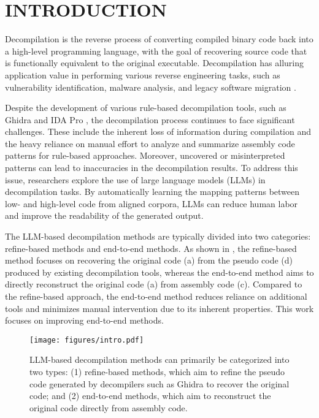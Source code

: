 \section{INTRODUCTION}

Decompilation \citep{ghidra,idapro,llm4decompile,refine_decompile,feng2024self} is the reverse process of converting compiled binary code back into a high-level programming language, with the goal of recovering source code that is functionally equivalent to the original executable.
Decompilation has alluring application value in performing various reverse engineering tasks, such as vulnerability identification, malware analysis, and legacy software migration \citep{decompilation1,decompilation2_rnn,llm4decompile,feng2024self,nova}.

Despite the development of various rule-based decompilation tools, such as Ghidra \citep{ghidra} and IDA Pro \citep{idapro}, the decompilation process continues to face significant challenges. These include the inherent loss of information during compilation \citep{variable_name,for_loop} and the heavy reliance on manual effort to analyze and summarize assembly code patterns for rule-based approaches\citep{ghidra,idapro}. 
Moreover, uncovered or misinterpreted patterns can lead to inaccuracies in the decompilation results\citep{decompilation1,decompile_ir1,variable_name,for_loop,llm4decompile}.
To address this issue, researchers explore the use of large language models (LLMs) in decompilation tasks\citep{slade,btc,llm4decompile,nova,feng2024self,refine_decompile}.
By automatically learning the mapping patterns between low- and high-level code from aligned corpora, LLMs can reduce human labor and improve the readability of the generated output.


The LLM-based decompilation methods are typically divided into two categories: refine-based methods\citep{llm4decompile,refine_decompile,hu2024degpt} and end-to-end methods\citep{feng2024self,slade,btc,nova}.
As shown in , the refine-based method focuses on recovering the original code (a) from the pseudo code (d) produced by existing decompilation tools, whereas the end-to-end method aims to directly reconstruct the original code (a) from assembly code (c).
Compared to the refine-based approach, the end-to-end method reduces reliance on additional tools and minimizes manual intervention due to its inherent properties.
This work focuses on improving end-to-end methods.

\begin{figure}[t]
    \centering
    \texttt{[image: figures/intro.pdf]}

    \caption{LLM-based decompilation methods can primarily be categorized into two types: (1) refine-based methods, which aim to refine the pseudo code generated by decompilers such as Ghidra to recover the original code; and (2) end-to-end methods, which aim to reconstruct the original code directly from assembly code.}
    \label{fig:intro}
\end{figure}

